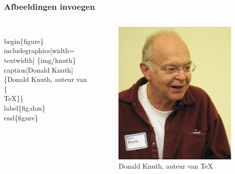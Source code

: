 \begin{frame}[fragile]
\frametitle{Afbeeldingen invoegen}

\begin{columns}[c]
  \begin{semiverbatim}
    \alert<1>{\\begin\{figure\}}
    \alert<2>{\\includegraphics[width=\\textwidth]
      \{img/knuth\}}
    \alert<3>{\\caption[Donald Knuth]\{Donald
      Knuth, auteur van \{\\TeX\}\}}
    \alert<4>{\\label\{fig:don\}}
    \alert<1>{\\end\{figure\}}
  \end{semiverbatim}
  
  \begin{figure}
    \includegraphics[width=\textwidth]{img/knuth}
    \caption[Donald Knuth]{Donald Knuth, auteur van {\TeX}}
    \label{fig:don}
  \end{figure}
  
\end{columns}

\end{frame}


